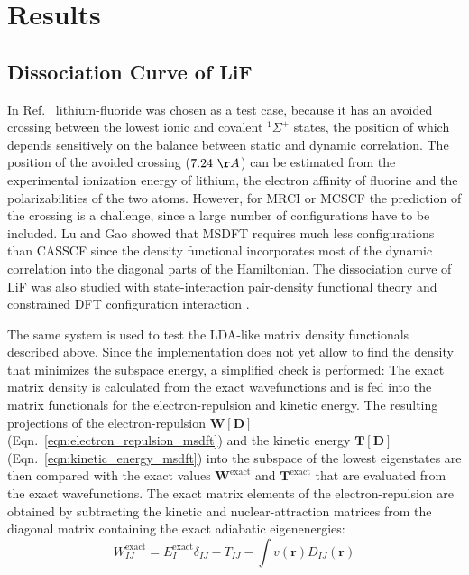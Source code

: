 \documentclass[journal=jpclcd,manuscript=letter]{achemso}
\newcommand\m[1]{\mathbf{#1}}
\renewcommand\vec[1]{\mathbf{#1}}
\begin{document}


\FloatBarrier

\section{Results}
\label{sec:results}

\subsection{Dissociation Curve of LiF}

In Ref.~\cite{Lu2022JPCL} lithium-fluoride was chosen as a test case, because it has an avoided crossing
between the lowest ionic and covalent $^1\Sigma^+$ states, the position of which depends sensitively on
the balance between static and dynamic correlation. The position of the avoided crossing ($7.24~\AA$) can be estimated
from the experimental ionization energy of lithium, the electron affinity of fluorine and the polarizabilities
of the two atoms. \cite{Werner1981} However, for MRCI or MCSCF the prediction of the crossing is
a challenge, since a large number of configurations have to be included. \cite{Werner1981}
Lu and Gao showed that MSDFT requires much less configurations than CASSCF since the density functional incorporates most of the
dynamic correlation into the diagonal parts of the Hamiltonian. \cite{Lu2022JPCL} The dissociation curve of
LiF was also studied with state-interaction pair-density functional theory \cite{Sand2018state}
and constrained DFT configuration interaction \cite{Wu2007configuration}.

The same system is used to test the LDA-like matrix density functionals described above. Since the implementation
does not yet allow to find the density that minimizes the subspace energy, a simplified check is performed:
The exact matrix density is calculated from the exact wavefunctions and is fed into the matrix functionals
for the electron-repulsion and kinetic energy.
The resulting projections of the electron-repulsion $\m{W}[\m{D}]$ (Eqn.~\ref{eqn:electron_repulsion_msdft})
and the kinetic energy $\m{T}[\m{D}]$ (Eqn.~\ref{eqn:kinetic_energy_msdft}) into the subspace of the lowest eigenstates are then compared with the
exact values $\m{W}^{\text{exact}}$ and $\m{T}^{\text{exact}}$ that are evaluated from the exact wavefunctions.
The exact matrix elements of the electron-repulsion are obtained by subtracting the kinetic and nuclear-attraction
matrices from the diagonal matrix containing the exact adiabatic eigenenergies:
\begin{equation}
 W^{\text{exact}}_{IJ} = E^{\text{exact}}_{I} \delta_{IJ} - T_{IJ} - \int v(\vec{r}) D_{IJ}(\vec{r})
\end{equation}
\end{document}
